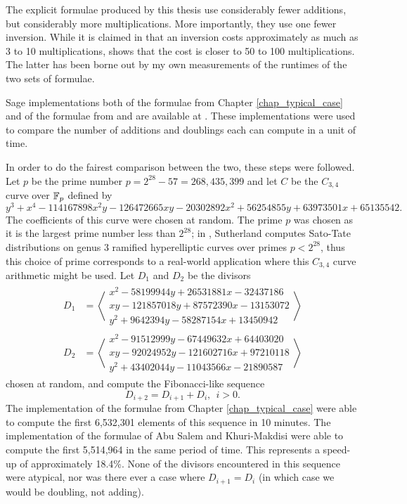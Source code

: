 The explicit formulae produced by this thesis use considerably fewer additions, but considerably more multiplications.
More importantly, they use one fewer inversion.
While it is claimed in \cite{salem07} that an inversion costs approximately as much as 3 to 10 multiplications,
 shows that the cost is closer to 50 to 100 multiplications.
The latter has been borne out by my own measurements of the runtimes of the two sets of formulae.

Sage implementations both of the formulae from Chapter \ref{chap_typical_case}
and of the formulae from \cite{salem07} and \cite{kmakdisi18} are available at \cite{github}.
These implementations were used to compare the number of additions and doublings each can compute in a unit of time.

In order to do the fairest comparison between the two, these steps were followed.
Let $p$ be the prime number $p = 2^{28} - 57 = 268,435,399$
and let $C$ be the $C_{3,4}$ curve over $\mathbb{F}_p$ defined by
 \[y^3 + x^4 - 114167898x^2y - 126472665xy - 20302892x^2 + 56254855y + 63973501x + 65135542.\]
The coefficients of this curve were chosen at random.
The prime $p$ was chosen as it is the largest prime number less than $2^{28}$;
in \cite{sutherland16}, Sutherland computes Sato-Tate distributions
on genus 3 ramified hyperelliptic curves over primes $p < 2^{28}$,
thus this choice of prime corresponds to a real-world application where this $C_{3,4}$ curve arithmetic might be used.
Let $D_1$ and $D_2$ be the divisors
\begin{align*}
  D_1 &= \left\langle \begin{array}{r}
    x^2 -  58199944y + 26531881x - 32437186 \\
     xy - 121857018y + 87572390x - 13153072 \\
    y^2 +   9642394y - 58287154x + 13450942
  \end{array} \right\rangle \\
  D_2 &= \left\langle \begin{array}{r}
    x^2 - 91512999y -  67449632x + 64403020 \\
     xy - 92024952y - 121602716x + 97210118 \\
    y^2 + 43402044y - 11043566x  - 21890587
  \end{array} \right\rangle
\end{align*}
chosen at random, and compute the Fibonacci-like sequence 
  \[ D_{i+2} = D_{i+1} + D_i, ~~ i > 0. \]
The implementation of the formulae from Chapter \ref{chap_typical_case} were able to compute
the first 6,532,301 elements of this sequence in 10 minutes.
The implementation of the formulae of Abu Salem and Khuri-Makdisi were able to compute
the first 5,514,964 in the same period of time.
This represents a speed-up of approximately 18.4\%.
None of the divisors encountered in this sequence were atypical,
nor was there ever a case where $D_{i+1} = D_{i}$
(in which case we would be doubling, not adding).


